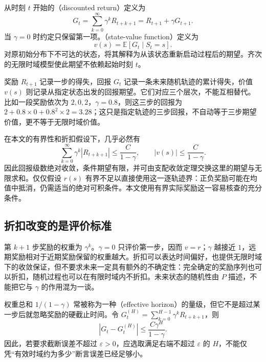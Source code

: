 \documentclass[UTF8]{ctexart}
\begin{document}
\begin{definition}[折扣回报与状态价值]
从时刻 $t$ 开始的（discounted return）定义为
\begin{equation}
  G_t=\sum_{k=0}^{\infty}\gamma^kR_{t+k+1}
     =R_{t+1}+\gamma G_{t+1}.
  \label{eq:mrp-return}
\end{equation}
当 $\gamma=0$ 时约定只保留第一项。（state-value function）定义为
\begin{equation}
  v(s)=\mathbb E[G_t\mid S_t=s].
  \label{eq:mrp-value}
\end{equation}
对原初始分布下不可达的状态，将其解释为从该状态重新启动过程后的期望。齐次的无限时域模型使此期望不依赖起始时刻 $t$。
\end{definition}

奖励 $R_{t+1}$ 记录一步的得失，回报 $G_t$ 记录一条未来随机轨迹的累计得失，价值 $v(s)$ 则记录从指定状态出发的回报期望。它们对应三个层次，不能互相替代。比如一段奖励依次为 $2,0,2$，$\gamma=0.8$，则这三步的回报为 $2+0.8\times0+0.8^2\times2=3.28$；这只是指定轨迹的三步回报，不自动等于三步期望价值，更不等于无限时域价值。

在本文的有界性和折扣假设下，几乎必然有
\begin{equation}
  \sum_{k=0}^{\infty}\gamma^k|R_{t+k+1}|
  \leq \frac{C}{1-\gamma},\qquad
  |v(s)|\leq\frac{C}{1-\gamma}.
  \label{eq:mrp-return-bound}
\end{equation}
因此回报级数绝对收敛，条件期望有限，并可由支配收敛定理交换这里的期望与无限求和。仅仅假设 $r(s)$ 有界不足以直接使用这一逐轨迹界：正负奖励可能在均值中抵消，仍需适当的绝对可积条件。本文使用有界实际奖励这一容易核查的充分条件。

\subsection{折扣改变的是评价标准}

第 $k+1$ 步奖励的权重为 $\gamma^k$。$\gamma=0$ 只评价第一步，因而 $v=r$；$\gamma$ 越接近 $1$，远期奖励相对于近期奖励保留的权重越大。折扣可以表达时间偏好，也提供无限时域下的收敛保证，但不要求未来一定具有额外的不确定性：完全确定的奖励序列也可以折扣，随机过程也可以在有限时域内不折扣。未来状态的随机性由 $P$ 描述，不能把它与 $\gamma$ 的作用混为一谈。

权重总和 $1/(1-\gamma)$ 常被称为一种（effective horizon）的量级，但它不是超过某一步后就忽略奖励的硬截止时间。令 $G_t^{(H)}=\sum_{k=0}^{H-1}\gamma^kR_{t+k+1}$，则
\begin{equation}
  |G_t-G_t^{(H)}|\leq\frac{C\gamma^H}{1-\gamma}.
  \label{eq:mrp-tail-bound}
\end{equation}
因此，若要求截断误差不超过 $\varepsilon>0$，应选取满足右端不超过 $\varepsilon$ 的 $H$，不能仅凭“有效时域约为多少”断言误差已经足够小。
\end{document}
